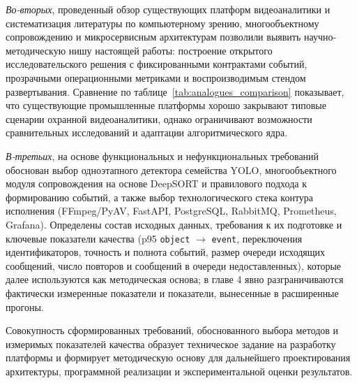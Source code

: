 \textit{Во-вторых}, проведенный обзор существующих платформ видеоаналитики и систематизация литературы по компьютерному зрению, многообъектному сопровождению и микросервисным архитектурам позволили выявить научно-методическую нишу настоящей работы: построение открытого исследовательского решения с фиксированными контрактами событий, прозрачными операционными метриками и воспроизводимым стендом развертывания. Сравнение по таблице~\ref{tab:analogues_comparison} показывает, что существующие промышленные платформы хорошо закрывают типовые сценарии охранной видеоаналитики, однако ограничивают возможности сравнительных исследований и адаптации алгоритмического ядра.

\textit{В-третьих}, на основе функциональных и нефункциональных требований обоснован выбор одноэтапного детектора семейства YOLO, многообъектного модуля сопровождения на основе DeepSORT и правилового подхода к формированию событий, а также выбор технологического стека контура исполнения (FFmpeg/PyAV, FastAPI, PostgreSQL, RabbitMQ, Prometheus, Grafana). Определены состав исходных данных, требования к их подготовке и ключевые показатели качества (p95 \texttt{object} $\rightarrow$ \texttt{event}, переключения идентификаторов, точность и полнота событий, размер очереди исходящих сообщений, число повторов и сообщений в очереди недоставленных), которые далее используются как методическая основа; в главе 4 явно разграничиваются фактически измеренные показатели и показатели, вынесенные в расширенные прогоны.

Совокупность сформированных требований, обоснованного выбора методов и измеримых показателей качества образует техническое задание на разработку платформы и формирует методическую основу для дальнейшего проектирования архитектуры, программной реализации и экспериментальной оценки результатов.
